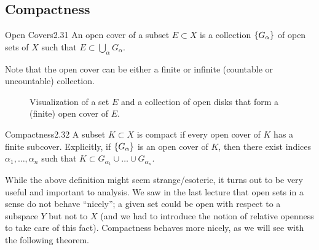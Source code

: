 \subsection{Compactness}
\begin{definition}{Open Covers}{2.31}
    An open cover of a subset $E \subset X$ is a collection $\set{G_\alpha}$ of open sets of $X$ such that $E \subset \bigcup_{\alpha} G_\alpha$.
\end{definition}
\noindent Note that the open cover can be either a finite or infinite (countable or uncountable) collection.
\begin{figure}[htbp]
    \centering
    \caption{Visualization of a set $E$ and a collection of open disks that form a (finite) open cover of $E$.}
    \label{fig11}
\end{figure}

\begin{definition}{Compactness}{2.32}
    A subset $K \subset X$ is compact if every open cover of $K$ has a finite subcover. Explicitly, if $\set{G_\alpha}$ is an open cover of $K$, then there exist indices $\alpha_1, \ldots, \alpha_n$ such that $K \subset G_{\alpha_1} \cup \ldots \cup G_{\alpha_n}$. 
\end{definition}
\noindent While the above definition might seem strange/esoteric, it turns out to be very useful and important to analysis. We saw in the last lecture that open sets in a sense do not behave ``nicely''; a given set could be open with respect to a subspace $Y$ but not to $X$ (and we had to introduce the notion of relative openness to take care of this fact). Compactness behaves more nicely, as we will see with the following theorem.

